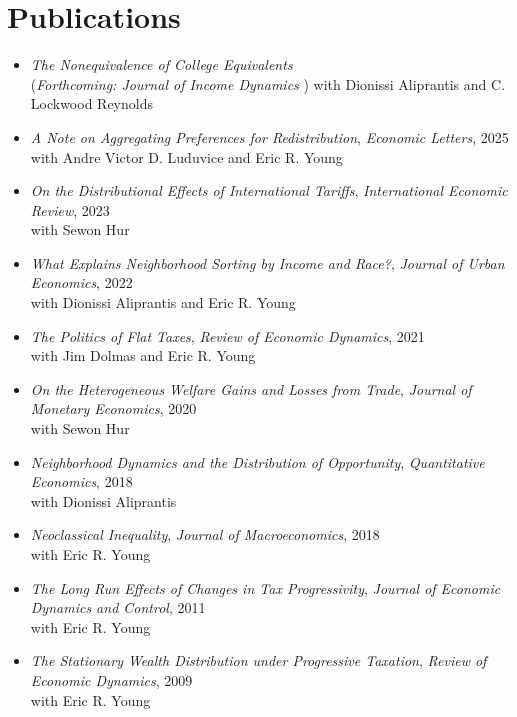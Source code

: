 \documentclass[11pt]{article}
\begin{document}
\section*{Publications}

\begin{itemize}
  \item \textit{The Nonequivalence of College Equivalents}\\ (\textit{Forthcoming: Journal of Income Dynamics })
  with Dionissi Aliprantis and C. Lockwood Reynolds \
  \item \textit{A Note on Aggregating Preferences for Redistribution}, \textit{Economic Letters}, 2025\\
  with Andre Victor D. Luduvice and Eric R. Young
  \item \textit{On the Distributional Effects of International Tariffs}, \textit{International Economic Review}, 2023\\
  with Sewon Hur
  \item \textit{What Explains Neighborhood Sorting by Income and Race?}, \textit{Journal of Urban Economics}, 2022\\
  with Dionissi Aliprantis and Eric R. Young
  \item \textit{The Politics of Flat Taxes}, \textit{Review of Economic Dynamics}, 2021\\
  with Jim Dolmas and Eric R. Young
  \item \textit{On the Heterogeneous Welfare Gains and Losses from Trade}, \textit{Journal of Monetary Economics}, 2020\\
  with Sewon Hur
  \item \textit{Neighborhood Dynamics and the Distribution of Opportunity}, \textit{Quantitative Economics}, 2018\\
  with Dionissi Aliprantis
  \item \textit{Neoclassical Inequality}, \textit{Journal of Macroeconomics}, 2018\\
  with Eric R. Young
  \item \textit{The Long Run Effects of Changes in Tax Progressivity}, \textit{Journal of Economic Dynamics and Control}, 2011\\
  with Eric R. Young
  \item \textit{The Stationary Wealth Distribution under Progressive Taxation}, \textit{Review of Economic Dynamics}, 2009\\
  with Eric R. Young
\end{itemize}
\end{document}
